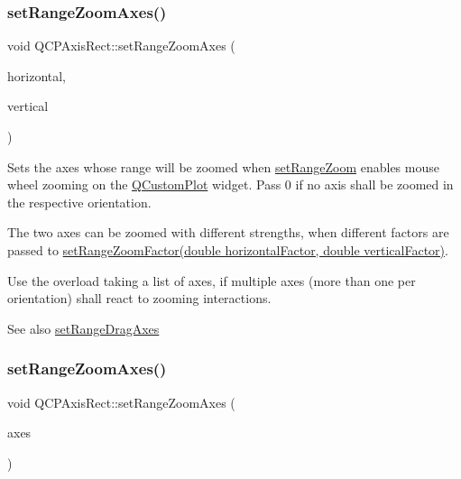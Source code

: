 \subsubsection{\texorpdfstring{set\+Range\+Zoom\+Axes()}{setRangeZoomAxes()}\hspace{0.1cm}{\footnotesize\ttfamily [1/3]}}
{\footnotesize\ttfamily void Q\+C\+P\+Axis\+Rect\+::set\+Range\+Zoom\+Axes (\begin{DoxyParamCaption}\item[{\hyperlink{classQCPAxis}{Q\+C\+P\+Axis} $\ast$}]{horizontal,  }\item[{\hyperlink{classQCPAxis}{Q\+C\+P\+Axis} $\ast$}]{vertical }\end{DoxyParamCaption})}

Sets the axes whose range will be zoomed when \hyperlink{classQCPAxisRect_a7960a9d222f1c31d558b064b60f86a31}{set\+Range\+Zoom} enables mouse wheel zooming on the \hyperlink{classQCustomPlot}{Q\+Custom\+Plot} widget. Pass 0 if no axis shall be zoomed in the respective orientation.

The two axes can be zoomed with different strengths, when different factors are passed to \hyperlink{classQCPAxisRect_a895d7ac745ea614e04056244b3c138ac}{set\+Range\+Zoom\+Factor(double horizontal\+Factor, double vertical\+Factor)}.

Use the overload taking a list of axes, if multiple axes (more than one per orientation) shall react to zooming interactions.

\begin{DoxySeeAlso}{See also}
\hyperlink{classQCPAxisRect_a648cce336bd99daac4a5ca3e5743775d}{set\+Range\+Drag\+Axes} 
\end{DoxySeeAlso}
\mbox{\label{classQCPAxisRect_a07a41be4eda0d42abe49475e9fa38b92}} 
\subsubsection{\texorpdfstring{set\+Range\+Zoom\+Axes()}{setRangeZoomAxes()}\hspace{0.1cm}{\footnotesize\ttfamily [2/3]}}
{\footnotesize\ttfamily void Q\+C\+P\+Axis\+Rect\+::set\+Range\+Zoom\+Axes (\begin{DoxyParamCaption}\item[{Q\+List$<$ \hyperlink{classQCPAxis}{Q\+C\+P\+Axis} $\ast$$>$}]{axes }\end{DoxyParamCaption})}

